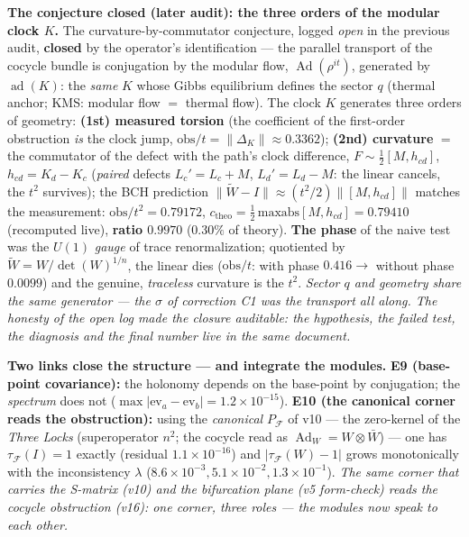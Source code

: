 \documentclass[11pt]{article}
\theoremstyle{definition}\newtheorem{deriv}{Derivation}
\begin{document}
\textbf{The conjecture closed (later audit): the three orders of the modular clock $K$.} The curvature-by-commutator conjecture, logged \emph{open} in the previous audit, \textbf{closed} by the operator's identification --- the parallel transport of the cocycle bundle is conjugation by the modular flow, $\operatorname{Ad}(\rho^{it})$, generated by $\operatorname{ad}(K)$: the \emph{same} $K$ whose Gibbs equilibrium defines the sector $q$ (thermal anchor; KMS: modular flow $=$ thermal flow). The clock $K$ generates three orders of geometry: \textbf{(1st) measured torsion} (the coefficient of the first-order obstruction \emph{is} the clock jump, $\mathrm{obs}/t=\lVert\Delta_K\rVert\approx0.3362$); \textbf{(2nd) curvature} $=$ the commutator of the defect with the path's clock difference, $F\sim\tfrac12[M,h_{cd}]$, $h_{cd}=K_d-K_c$ (\emph{paired} defects $L_c'=L_c+M$, $L_d'=L_d-M$: the linear cancels, the $t^2$ survives); the BCH prediction $\lVert\tilde W-I\rVert\approx(t^2/2)\lVert[M,h_{cd}]\rVert$ matches the measurement: $\mathrm{obs}/t^2=0.79172$, $c_{\mathrm{theo}}=\tfrac12\,\mathrm{maxabs}[M,h_{cd}]=0.79410$ (recomputed live), \textbf{ratio $0.9970$} ($0.30\%$ of theory). \textbf{The phase} of the naive test was the $U(1)$ \emph{gauge} of trace renormalization; quotiented by $\tilde W=W/\det(W)^{1/n}$, the linear dies ($\mathrm{obs}/t$: with phase $0.416\to$ without phase $0.0099$) and the genuine, \emph{traceless} curvature is the $t^2$. \emph{Sector $q$ and geometry share the same generator --- the $\sigma$ of correction C1 was the transport all along. The honesty of the open log made the closure auditable: the hypothesis, the failed test, the diagnosis and the final number live in the same document.}

\textbf{Two links close the structure --- and integrate the modules.} \textbf{E9 (base-point covariance):} the holonomy depends on the base-point by conjugation; the \emph{spectrum} does not ($\max|\mathrm{ev}_a-\mathrm{ev}_b|=1.2\times10^{-15}$). \textbf{E10 (the canonical corner reads the obstruction):} using the \emph{canonical} $P_{\mathcal F}$ of v10 --- the zero-kernel of the \emph{Three Locks} (superoperator $n^2$; the cocycle read as $\operatorname{Ad}_W=W\otimes\bar W$) --- one has $\tau_{\mathcal F}(I)=1$ exactly (residual $1.1\times10^{-16}$) and $|\tau_{\mathcal F}(W)-1|$ grows monotonically with the inconsistency $\lambda$ ($8.6\times10^{-3}, 5.1\times10^{-2}, 1.3\times10^{-1}$). \emph{The same corner that carries the S-matrix (v10) and the bifurcation plane (v5 form-check) reads the cocycle obstruction (v16): one corner, three roles --- the modules now speak to each other.}
\end{document}
